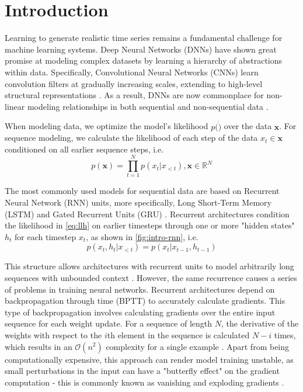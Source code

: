\section{Introduction}\label{sec:intro}

Learning to generate realistic time series remains a fundamental challenge for machine learning systems.
Deep Neural Networks (DNNs) have shown great promise at modeling complex datasets by learning a hierarchy of abstractions within data.
 \cite{bengio_representation_2013, bengio_neural_2003}
Specifically, Convolutional Neural Networks (CNNs) learn convolution filters at gradually increasing scales, extending to high-level structural representations \cite{krizhevsky_imagenet_2012, lecun_convolutional_1998}.
As a result, DNNs are now commonplace for non-linear modeling relationships in both sequential and non-sequential data
\cite{goodfellow_deep_2016, maaloe_auxiliary_nodate, oord_wavenet_2016, thomsen_deepfret_2020}.

When modeling data, we optimize the model's likelihood $p(\dot)$ over the data $\mathbf{x}$.
For sequence modeling, we calculate the likelihood of each step of the data $x_t\in\mathbf{x}$ conditioned on all earlier sequence steps, i.e.
\begin{equation}\label{eq:llh}
    p(\mathbf{x}) = \prod^N_{t=1}  p(x_t | x_{<t}) , \mathbf{x}\in \mathbb{R}^N
\end{equation}

The most commonly used models for sequential data are based on  Recurrent Neural Network (RNN) units, more specifically, Long Short-Term Memory (LSTM) and Gated Recurrent Units (GRU) \cite{hochreiter_long_1997, karim_lstm_2018, sundermeyer_lstm_2012, cho_learning_2014}.
Recurrent architectures condition the likelihood in \cref{eq:llh} on earlier timesteps through one or more "hidden states" $h_t$ for each timestep $x_t$, as shown in \cref{fig:intro-rnn}, i.e.
\begin{equation}\label{eq:llh-rnn}
    p(x_t, h_t | x_{<t}) = p(x_t | x_{t-1}, h_{t-1})
\end{equation}

This structure allows architectures with recurrent units to model arbitrarily long sequences with unbounded context \cite{dauphin_language_2017}.
However, the same recurrence causes a series of problems in training neural networks. 
Recurrent architectures depend on backpropagation through time (BPTT) to accurately calculate gradients. 
This type of backpropagation involves calculating gradients over the entire input sequence for each weight update. 
For a sequence of length $N$, the derivative of the weights with respect to the $i$th element in the sequence is calculated $N-i$ times, which results in an $\mathcal{O}(n^2)$ complexity for a single example \cite{williams_gradient-based_1995}.
Apart from being computationally expensive, this approach can render model training unstable, as small perturbations in the input can have a "butterfly effect" on the gradient computation - this is commonly known as vanishing and exploding gradients \cite{cuellar_application_2006}.

